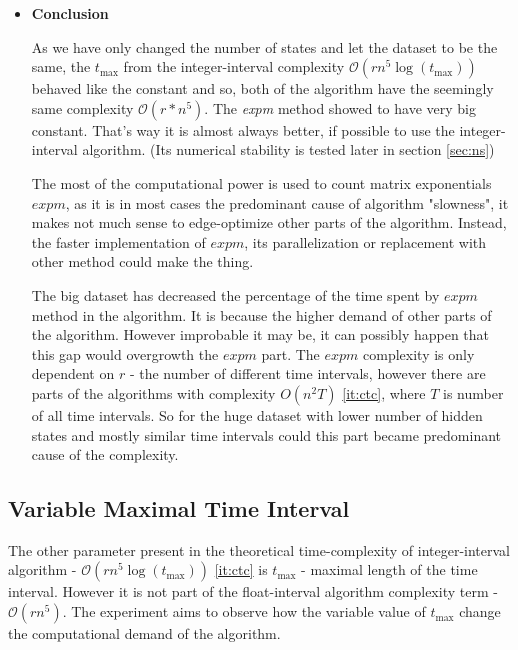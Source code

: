 \documentclass[thesis=M,english]{FITthesis}[2012/10/20]
\begin{document}
\begin{itemize}
\item \textbf{ Conclusion }

As we have only changed the number of states and let the dataset to be the same, the $t_{\max}$ from the integer-interval complexity $\mathcal{O}(r n^5 \log(t_{\max}))$ behaved like the constant and so, both of the algorithm have the seemingly same complexity $\mathcal{O}(r*n^5)$. The \textit{expm} method showed to have very big constant. That's way it is almost always better, if possible to use the integer-interval algorithm. (Its numerical stability is tested later in section \ref{sec:ns}) 

The most of the computational power is used to count matrix exponentials $expm$, as it is in most cases the predominant cause of algorithm "slowness", it makes not much sense to edge-optimize other parts of the algorithm. Instead, the faster implementation of $expm$, its parallelization or replacement with other method could make the thing.      

The big dataset \label{fig:e2big} has decreased the percentage of the time spent by $expm$ method in the algorithm. It is because the higher demand of other parts of the algorithm. However improbable it may be, it can possibly happen that this gap would overgrowth the $expm$ part. The $expm$ complexity is only dependent on $r$ - the number of different time intervals, however there are parts of the algorithms with complexity ${O}(n^2T)$ \ref{it:ctc}, where $T$ is number of all time intervals. So for the huge dataset with lower number of hidden states and mostly similar time intervals could this part became predominant cause of the complexity.   

\end{itemize}

\subsection{Variable Maximal Time Interval}

The other parameter present in the theoretical time-complexity of integer-interval algorithm - $\mathcal{O}(r n^5 \log(t_{\max}))$ \ref{it:ctc} is $t_{\max}$ - maximal length of the time interval. However it is not part of the float-interval algorithm complexity term - $\mathcal{O}(r n^5)$. The experiment aims to observe how the variable value of $t_{\max}$ change the computational demand of the algorithm.  
\end{document}
